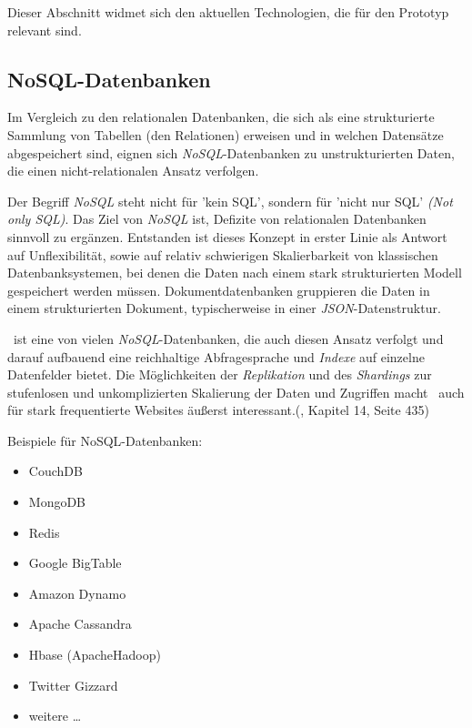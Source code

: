 Dieser Abschnitt widmet sich den aktuellen Technologien, die für den Prototyp relevant sind.

\subsection{NoSQL-Datenbanken}

Im Vergleich zu den relationalen Datenbanken, die sich als eine strukturierte Sammlung von Tabellen (den Relationen) erweisen und in welchen Datensätze abgespeichert sind, eignen sich \textit{NoSQL}-Datenbanken zu unstrukturierten Daten, die einen nicht-relationalen Ansatz verfolgen. 

Der Begriff \textit{NoSQL} steht nicht für 'kein SQL', sondern für 'nicht nur SQL' \textit{(Not only SQL)}. Das Ziel von \textit{NoSQL} ist, Defizite von relationalen Datenbanken sinnvoll zu ergänzen. Entstanden ist dieses Konzept in erster Linie als Antwort auf Unflexibilität, sowie auf relativ schwierigen Skalierbarkeit von klassischen Datenbanksystemen, bei denen die Daten nach einem stark strukturierten Modell gespeichert werden müssen. \cite{mySQL} Dokumentdatenbanken gruppieren die Daten in einem strukturierten Dokument, typischerweise in einer \textit{JSON}-Datenstruktur.

\mongo\ ist eine von vielen \textit{NoSQL}-Datenbanken, die auch diesen Ansatz verfolgt und darauf aufbauend eine reichhaltige Abfragesprache und \textit{Indexe} auf einzelne Datenfelder bietet. Die Möglichkeiten der \textit{Replikation} und des \textit{Shardings} zur stufenlosen und unkomplizierten Skalierung der Daten und Zugriffen macht \mongo\ auch für stark frequentierte Websites äußerst interessant.(\cite{Hollosi.2012}, Kapitel 14, Seite 435)

Beispiele für NoSQL-Datenbanken:
\begin{multicols}{2}
\begin{itemize}
\item CouchDB
\item MongoDB
\item Redis
\item Google BigTable
\item Amazon Dynamo
\item Apache Cassandra
\item Hbase (ApacheHadoop)
\item Twitter Gizzard
\item weitere …
\end{itemize}
\end{multicols}

